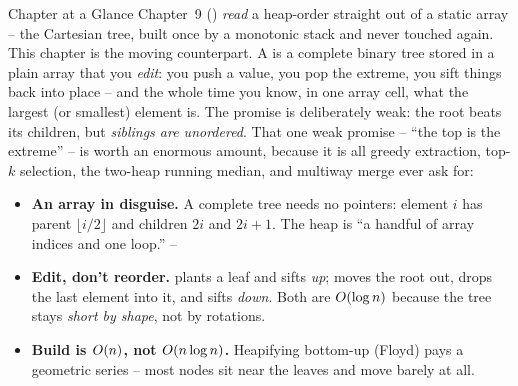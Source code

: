 
\begin{chaptertheorybox}{Chapter at a Glance}
Chapter~9 () \emph{read} a heap-order straight out of a static array -- the Cartesian tree,
built once by a monotonic stack and never touched again. This chapter is the moving counterpart. A
 is a complete binary tree stored in a plain array that you \emph{edit}: you push a
value, you pop the extreme, you sift things back into place -- and the whole time you know, in one array
cell, what the largest (or smallest) element is. The promise is deliberately weak: the root beats its
children, but \emph{siblings are unordered}. That one weak promise -- ``the top is the extreme'' -- is
worth an enormous amount, because it is all greedy extraction, top-$k$ selection, the two-heap running
median, and multiway merge ever ask for:
\begin{itemize}[nosep]
  \item \textbf{An array in disguise.} A complete tree needs no pointers: element $i$ has parent
        $\lfloor i/2\rfloor$ and children $2i$ and $2i+1$. The heap is ``a handful of array indices and
        one  loop.'' \hfill {}--
  \item \textbf{Edit, don't reorder.}  plants a leaf and sifts \emph{up};  moves the
        root out, drops the last element into it, and sifts \emph{down}. Both are $O(\log n)$ because
        the tree stays \emph{short by shape}, not by rotations. \hfill {}
  \item \textbf{Build is $O(n)$, not $O(n\log n)$.} Heapifying bottom-up (Floyd) pays a geometric
        series -- most nodes sit near the leaves and move barely at all. \hfill {}
\end{itemize}


\end{chaptertheorybox}
